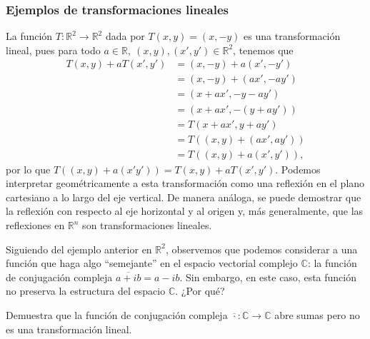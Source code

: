 \documentclass[notasLineal]{subfiles}
\begin{document}
\subsubsection*{Ejemplos de transformaciones lineales}

La función $T:\mathbb{R}^2\to \mathbb{R}^2$ dada por $T(x,y)=(x,-y)$ es una transformación lineal, pues para todo $a\in\mathbb{R}, \ (x,y), (x',y')\in\mathbb{R}^2$, tenemos que
\begin{align*}
    T(x,y) + aT(x',y') &= (x,-y) + a(x',-y') \\
                       &= (x,-y) + (ax',-ay') \\
                       &= (x+ax', -y-ay') \\
                       &= (x+ax', -(y+ay')) \\
                       &= T(x+ax', y+ay') \\
                       &= T((x,y)+(ax',ay')) \\
                       &= T((x,y)+a(x',y')),
\end{align*}
por lo que $T((x,y)+a(x'y')) = T(x,y) + aT(x',y')$. Podemos interpretar geométricamente a esta transformación como una reflexión en el plano cartesiano a lo largo del eje vertical. De manera análoga, se puede demostrar que la reflexión con respecto al eje horizontal y al origen y, más generalmente, que las reflexiones en $\mathbb{R}^n$ son transformaciones lineales. %


Siguiendo del ejemplo anterior en $\mathbb{R}^2$, observemos que podemos considerar a una función que haga algo ``semejante'' en el espacio vectorial complejo $\mathbb{C}$: la función de conjugación compleja $\overline{a+ib} = a-ib$. Sin embargo, en este caso, esta función no preserva la estructura del espacio $\mathbb{C}$. ¿Por qué?

\begin{Ejer}\label{ejer:18}
Demuestra que la función de conjugación compleja $\overline{\cdot}:\mathbb{C}\to\mathbb{C}$ abre sumas pero no es una transformación lineal.
\end{Ejer}
\end{document}
